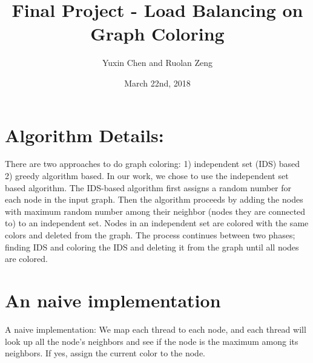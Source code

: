 \documentclass[12pt] {article}
\begin{document}
\title{Final Project - Load Balancing on Graph Coloring}
\author{Yuxin Chen and Ruolan Zeng}
\date{March 22nd, 2018}
\maketitle

\section*{Algorithm Details:}
There are two approaches to do graph coloring: 1) independent set (IDS) based 2) greedy algorithm based. In our work, we chose to use the independent set based algorithm. %
The IDS-based algorithm first assigns a random number for each node in the input graph. Then the algorithm proceeds by adding the nodes with maximum random number among their neighbor (nodes they are connected to) to an independent set. Nodes in an independent set are colored with the same colors and deleted from the graph. The process continues between two phases; finding IDS and coloring the IDS and deleting it from the graph until all nodes are colored. 

\section*{An naive implementation}
A naive implementation: 
We map each thread to each node, and each thread will look up all the node's neighbors and see if the node is the maximum among its neighbors. If yes, assign the current
color to the node.
\end{document}
